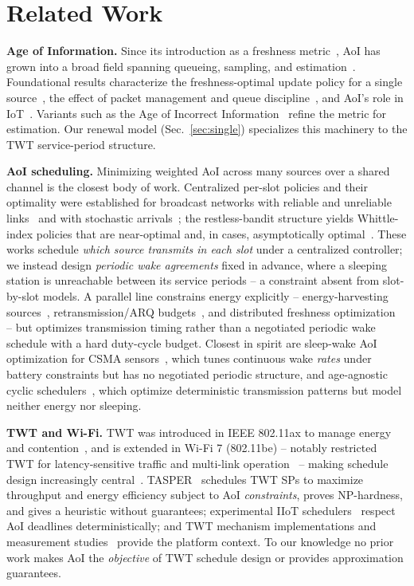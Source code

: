 \section{Related Work}
\label{sec:related}

\textbf{Age of Information.} Since its introduction as a freshness
metric~\cite{kaul12}, AoI has grown into a broad field spanning queueing,
sampling, and estimation~\cite{kosta17,yates21}. Foundational results
characterize the freshness-optimal update policy for a single
source~\cite{sun17}, the effect of packet management and queue
discipline~\cite{costa16,bedewy19q,yates19}, and AoI's role in
IoT~\cite{abdelmagid19}. Variants such as the Age of Incorrect
Information~\cite{maatouk20} refine the metric for estimation. Our renewal
model (Sec.~\ref{sec:single}) specializes this machinery to the TWT
service-period structure.

\textbf{AoI scheduling.} Minimizing weighted AoI across many sources over a
shared channel is the closest body of work. Centralized per-slot policies and
their optimality were established for broadcast networks with reliable and
unreliable links~\cite{kadota18,talak20} and with stochastic
arrivals~\cite{hsu20,kadota21}; the restless-bandit structure yields
Whittle-index policies that are near-optimal and, in cases, asymptotically
optimal~\cite{tripathi24}. These works schedule \emph{which source transmits
in each slot} under a centralized controller; we instead design \emph{periodic
wake agreements} fixed in advance, where a sleeping station is unreachable
between its service periods -- a constraint absent from slot-by-slot models.
A parallel line constrains energy explicitly -- energy-harvesting
sources~\cite{yates15,abdelmagid20}, retransmission/ARQ budgets~\cite{ceran19},
and distributed freshness optimization~\cite{talak18dist} -- but optimizes
transmission timing rather than a negotiated periodic wake schedule with a
hard duty-cycle budget. Closest in spirit are sleep-wake AoI optimization for
CSMA sensors~\cite{bedewy20}, which tunes continuous wake \emph{rates} under
battery constraints but has no negotiated periodic structure, and age-agnostic
cyclic schedulers~\cite{gamgam23}, which optimize deterministic transmission
patterns but model neither energy nor sleeping.

\textbf{TWT and Wi-Fi.} TWT was introduced in IEEE 802.11ax to manage
energy and contention~\cite{ieee80211ax,bellalta16,khorov19}, and is extended
in Wi-Fi 7 (802.11be) -- notably restricted TWT for latency-sensitive
traffic and multi-link operation~\cite{lopezperez19,garciarodriguez21} --
making schedule design increasingly central~\cite{twtsurvey25}.
TASPER~\cite{tasper25} schedules TWT SPs to maximize throughput and energy
efficiency subject to AoI \emph{constraints}, proves NP-hardness, and gives a
heuristic without guarantees; experimental IIoT schedulers~\cite{twtdet25}
respect AoI deadlines deterministically; and TWT mechanism implementations
and measurement studies~\cite{wns3twt24a,wns3twt24b,nurchis19} provide the
platform context. To our knowledge no prior work makes AoI the
\emph{objective} of TWT schedule design or provides approximation guarantees.

